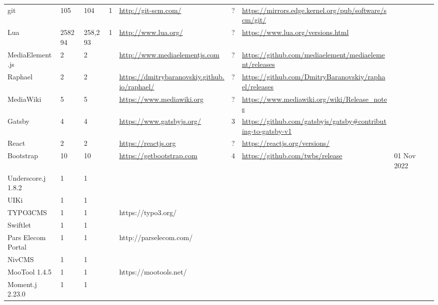 \begin{table}[!htp]
\begin{tabular}{|l|l|l|l|l|l|l|l|l|}
				git &105 &104 &1 &\ul{http://git-scm.com/} &? &\ul{https://mirrors.edge.kernel.org/pub/software/scm/git/} & \\
				Lua &258294 &258,293 &1 &\ul{http://www.lua.org/} &? &\ul{https://www.lua.org/versions.html} & \\
				MediaElement.js &2 &2 & &\ul{http://www.mediaelementjs.com} &? &\ul{https://github.com/mediaelement/mediaelement/releases} & \\
				Raphael &2 &2 & &\ul{https://dmitrybaranovskiy.github.io/raphael/} &? &\ul{https://github.com/DmitryBaranovskiy/raphael/releases} & \\
				MediaWiki &5 &5 & &\ul{https://www.mediawiki.org} &? &\ul{https://www.mediawiki.org/wiki/Release\_notes} & \\
				Gatsby &4 &4 & &\ul{https://www.gatsbyjs.org/} &3 &\ul{https://github.com/gatsbyjs/gatsby\#contributing-to-gatsby-v1} & \\
				React &2 &2 & &\ul{https://reactjs.org} &? &\ul{https://reactjs.org/versions/} & \\
				Bootstrap &10 &10 & &\ul{https://getbootstrap.com} &4 &\ul{https://github.com/twbs/release} &01 Nov 2022 \\
				Underscore.j 1.8.2 &1 &1 & & & & & \\
				UIKi &1 &1 & & & & & \\
				TYPO3CMS &1 &1 & &https://typo3.org/ & & & \\
				Swiftlet &1 &1 & & & & & \\
				Pars Elecom Portal &1 &1 & &http://parselecom.com/ & & & \\
				NivCMS &1 &1 & & & & & \\
				MooTool 1.4.5 &1 &1 & &https://mootools.net/ & & & \\
				Moment.j 2.23.0 &1 &1 & & & & & \\
				\bottomrule
			\end{tabular}
		\end{table}
